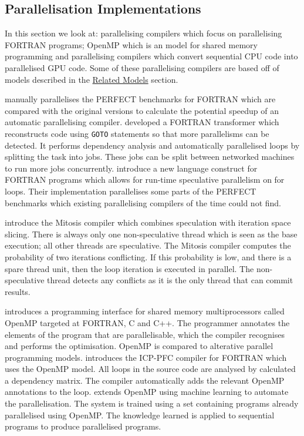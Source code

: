 \subsection{Parallelisation Implementations}
In this section we look at: parallelising compilers which focus on parallelising FORTRAN programs; OpenMP which is an model for shared memory programming and parallelising compilers which convert sequential CPU code into parallelised GPU code. Some of these parallelising compilers are based off of models described in the \hyperref[sec:related-models]{Related Models} section.

\textcite{Eigenmann1998} manually parallelises the PERFECT benchmarks for FORTRAN which are compared with the original versions to calculate the potential speedup of an automatic parallelising compiler.
\textcite{DHollander1998} developed a FORTRAN transformer which reconstructs code using \texttt{GOTO} statements so that more parallelisms can be detected. It performs dependency analysis and automatically parallelised loops by splitting the task into jobs. These jobs can be split between networked machines to run more jobs concurrently.
\textcite{Rauchwerger1999} introduce a new language construct for FORTRAN programs which allows for run-time speculative parallelism on for loops. Their implementation parallelises some parts of the PERFECT benchmarks which existing parallelising compilers of the time could not find.

\textcite{Quinones2005} introduce the Mitosis compiler which combines speculation with iteration space slicing. There is always only one non-speculative thread which is seen as the base execution; all other threads are speculative. The Mitosis compiler computes the probability of two iterations conflicting. If this probability is low, and there is a spare thread unit, then the loop iteration is executed in parallel. The non-speculative thread detects any conflicts as it is the only thread that can commit results.

\textcite{Dagum1998} introduces a programming interface for shared memory multiprocessors called OpenMP targeted at FORTRAN, C and C++. The programmer annotates the elements of the program that are parallelisable, which the compiler recognises and performs the optimisation. OpenMP is compared to alterative parallel programming models.
\textcite{Kim2000} introduces the ICP-PFC compiler for FORTRAN which uses the OpenMP model. All loops in the source code are analysed by calculated a dependency matrix. The compiler automatically adds the relevant OpenMP annotations to the loop.
\textcite{Lam2011} extends OpenMP using machine learning to automate the parallelisation. The system is trained using a set containing programs already parallelised using OpenMP. The knowledge learned is applied to sequential programs to produce parallelised programs.

